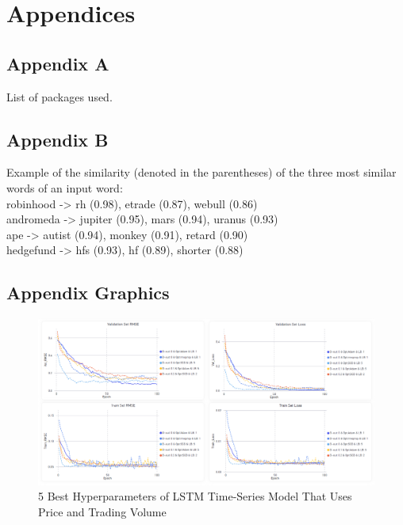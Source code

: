 \documentclass[11pt, a4paper]{article}
\begin{document}



\section{Appendices}

\subsection{Appendix A}
\label{appendix:A}
List of packages used.

\subsection{Appendix B}
\label{appendix:B}

Example of the similarity (denoted in the parentheses) of the three most similar words of an input word: \\
robinhood -> rh (0.98), etrade (0.87), webull (0.86) \\
andromeda -> jupiter (0.95), mars (0.94), uranus (0.93) \\
ape -> autist (0.94), monkey (0.91), retard (0.90) \\
hedgefund -> hfs (0.93), hf (0.89), shorter (0.88) \\

\subsection{Appendix Graphics}
\label{appendix:Graphics}

\begin{figure}
    \centering
    \includegraphics[width=\textwidth]{Only_Trading_Volume.png}
    \caption{5 Best Hyperparameters of LSTM Time-Series Model That Uses Price and Trading Volume}
\end{figure}
\end{document}
